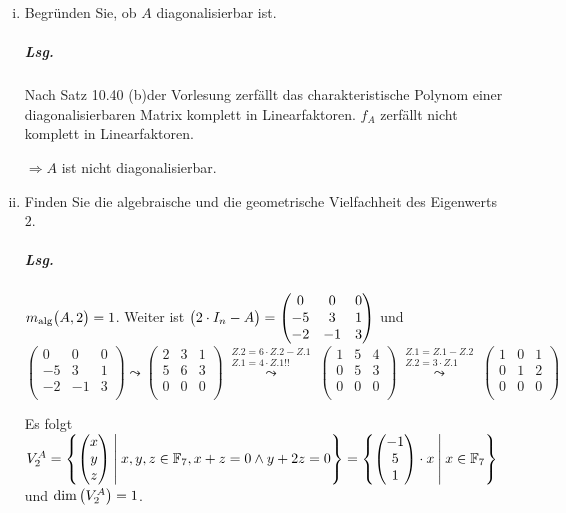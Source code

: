 \documentclass{scrreprt}
\begin{document}
\begin{enumerate}[(i)]
\item Begründen Sie, ob $A$ diagonalisierbar ist.

  \subparagraph{Lsg.} Nach Satz 10.40 (b)der Vorlesung zerfällt das
  charakteristische Polynom einer diagonalisierbaren Matrix komplett in
  Linearfaktoren.
  $f_A$ zerfällt nicht komplett in Linearfaktoren.

  $\Rightarrow A$ ist nicht diagonalisierbar.

\item Finden Sie die algebraische und die geometrische Vielfachheit des
  Eigenwerts $2$.

  \subparagraph{Lsg.} $m_{\text{alg}}\qty\big(A, 2) = 1$.
  Weiter ist $\qty\big(2 \cdot I_n - A) = \begin{pmatrix}
    0 & 0 & 0 \\
    -5 & 3 & 1 \\
    -2 & -1 & 3 \\
  \end{pmatrix}$ und
  \[
    \begin{pmatrix}
      0 & 0 & 0 \\
      -5 & 3 & 1 \\
      -2 & -1 & 3 \\
    \end{pmatrix} \leadsto \begin{pmatrix}
      2 & 3 & 1 \\
      5 & 6 & 3 \\
      0 & 0 & 0 \\
    \end{pmatrix} \overset{
      \substack{
        Z.2 = 6 \cdot Z.2 - Z.1 \\
        Z.1 = 4 \cdot Z.1 !!
      }
    }\leadsto \begin{pmatrix}
      1 & 5 & 4 \\
      0 & 5 & 3 \\
      0 & 0 & 0 \\
    \end{pmatrix} \overset{
      \substack{
        Z.1 = Z.1 - Z.2 \\
        Z.2 = 3 \cdot Z.1
      }
    }\leadsto \begin{pmatrix}
      1 & 0 & 1 \\
      0 & 1 & 2 \\
      0 & 0 & 0 \\
    \end{pmatrix}
  \]

  Es folgt $V_2^A = \qty{
    \begin{pmatrix}x\\y\\z\end{pmatrix}
    \:\middle|\:
    x,y,z \in \mathbb{F}_7, x + z = 0 \land y + 2z = 0
  } = \qty{
    \begin{pmatrix}-1\\5\\1\end{pmatrix} \cdot x
    \:\middle|\:
    x \in \mathbb{F}_7
  }$ und $\dim\qty\big(V_2^A) = 1$.


\end{enumerate}
\end{document}
